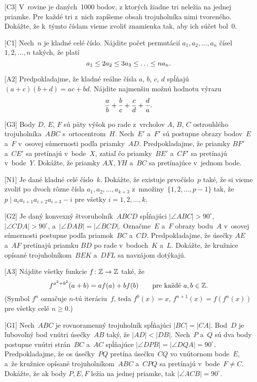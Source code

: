 {%
[C3]
V~rovine je daných~1000 bodov, z ktorých žiadne tri neležia na jednej priamke. Pre každé tri z~nich zapíšeme obsah trojuholníka nimi tvoreného. Dokážte, že k~týmto číslam vieme zvoliť znamienka tak, aby ich súčet bol~0.
}

{%
[C1]
Nech~$n$ je kladné celé číslo. Nájdite počet permutácií $a_1,a_2,\ldots,a_n$ čísel $1,2,\ldots,n$ takých, že platí
$$
a_1 \leq 2a_2 \leq 3a_3 \leq \ldots \leq n a_n.
\belowdisplayskip0pt
$$
}

{%
[A2]
Predpokladajme, že kladné reálne čísla $a$, $b$, $c$, $d$ spĺňajú $(a+c)(b+d) = ac + bd$. Nájdite najmenšiu možnú hodnotu výrazu
$$
\frac ab + \frac bc + \frac cd + \frac da.
\belowdisplayskip0pt
$$
}

{%
[G3]
Body $D$, $E$, $F$ sú päty výšok po rade z~vrcholov $A$, $B$, $C$ ostrouhlého trojuholníka~$ABC$ s~ortocentrom~$H$. Nech~$E'$ a~$F'$ sú postupne obrazy bodov~$E$ a~$F$ v~osovej súmernosti podľa priamky~$AD$. Predpokladajme, že priamky $BF'$ a~$CE'$ sa pretínajú v~bode~$X$, zatiaľ čo priamky~$BE'$ a~$CF'$ sa pretínajú v~bode~$Y$. Dokážte, že priamky $AX$, $YH$ a~$BC$ sa pretínajúce v~jednom bode.
}

{%
[N1]
Je dané kladné celé číslo~$k$. Dokážte, že existuje prvočíslo~$p$ také, že si vieme zvoliť po dvoch rôzne čísla $a_1,a_2,\ldots,a_{k+3}$ z~množiny~$\{1,2,\ldots,p-1\}$ tak, že $p \mid a_ia_{i+1}a_{i+2}a_{i+3}-i$ pre všetky $i=1,2,\ldots,k$.
}

{%
[G2]
Je daný konvexný štvoruholník~$ABCD$ spĺňajúci $|\angle ABC|>90^\circ$, $|\angle CDA|>90^\circ$, a~$|\angle DAB|=|\angle BCD|$. Označme~$E$ a~$F$ obrazy bodu~$A$ v~osovej súmernosti postupne podľa priamok~$BC$ a~$CD$. Predpokladajme, že úsečky $AE$ a~$AF$ pretínajú priamku $BD$ po rade v~bodoch~$K$ a~$L$. Dokážte, že kružnice opísané trojuholníkom~$BEK$ a~$DFL$ sa navzájom dotýkajú.
}

{%
[A3]
Nájdite všetky funkcie $f\colon {\Bbb Z} \to {\Bbb Z}$ také, že
$$
f^{a^2+b^2}(a+b)=af(a)+bf(b)
\qquad \hbox{pre každé $a,b \in {\Bbb Z}$.}
$$
(Symbol $f^n$ označuje $n$-tú iteráciu~$f$, teda $f^0(x)=x$, $f^{n+1}(x)=f(f^n(x))$ pre všetky celé $n \ge 0$.)
}

{%
[G1]
Nech~$ABC$ je rovnoramenný trojuholník spĺňajúci $|BC|=|CA|$. Bod~$D$ je ľubovoľný bod vnútri úsečky~$AB$ taký, že $|AD|<|DB|$. Nech~$P$ a~$Q$ sú dva body postupne vnútri strán~$BC$ a~$AC$ spĺňajúce $|\angle DPB|=|\angle DQA|=90^\circ$. Predpokladajme, že os úsečky~$PQ$ pretína úsečku~$CQ$ vo vnútornom bode~$E$, a~že kružnice opísané trojuholníkom~$ABC$ a~$CPQ$ sa pretínajú v~bode~$F \ne C$. Dokážte, že ak body $P,E,F$ ležia na jednej priamke, tak $|\angle ACB|=90^\circ$.
}

